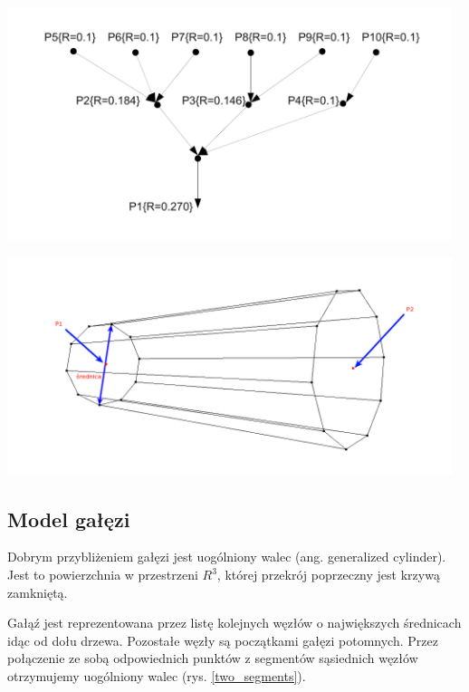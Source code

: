 \begin{center}
	\includegraphics[width=130mm]{images/model/node_radius.pdf}
	\label{node_radius}
\end{center}


\begin{center}
	\includegraphics[width=130mm]{images/model/two_segments.png}
	\label{two_segments}
\end{center}

\subsection{Model gałęzi}
Dobrym przybliżeniem gałęzi jest uogólniony walec (ang. generalized cylinder). Jest to powierzchnia w przestrzeni $R^3$, której przekrój poprzeczny jest krzywą zamkniętą.

Gałąź jest reprezentowana przez listę kolejnych węzłów o największych średnicach idąc od dołu drzewa. Pozostałe węzły są początkami gałęzi potomnych. Przez połączenie ze sobą odpowiednich punktów z segmentów sąsiednich węzłów otrzymujemy uogólniony walec (rys. \ref{two_segments}).


